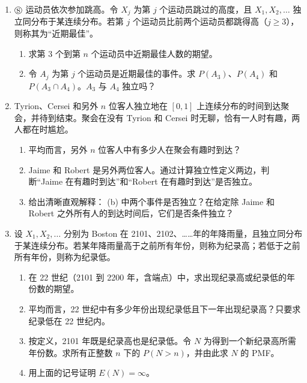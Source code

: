 \documentclass[UTF8,12pt,a4paper,fontset=fandol]{ctexart}
\begin{document}
\begin{enumerate}
  \item $\circledS$ 运动员依次参加跳高。令 $X_j$ 为第 $j$ 个运动员跳过的高度，且 $X_1,X_2,\ldots$ 独立同分布于某连续分布。若第 $j$ 个运动员比前两个运动员都跳得高（$j\ge3$），则称其为“近期最佳”。
  \begin{enumerate}
    \item 求第 $3$ 个到第 $n$ 个运动员中近期最佳人数的期望。
    \item 令 $A_j$ 为第 $j$ 个运动员是近期最佳的事件。求 $P(A_3)$、$P(A_4)$ 和 $P(A_3\cap A_4)$。$A_3$ 与 $A_4$ 独立吗？
  \end{enumerate}

  \item Tyrion、Cersei 和另外 $n$ 位客人独立地在 $[0,1]$ 上连续分布的时间到达聚会，并待到结束。聚会在没有 Tyrion 和 Cersei 时无聊，恰有一人时有趣，两人都在时尴尬。
  \begin{enumerate}
    \item 平均而言，另外 $n$ 位客人中有多少人在聚会有趣时到达？
    \item Jaime 和 Robert 是另外两位客人。通过计算独立性定义两边，判断“Jaime 在有趣时到达”和“Robert 在有趣时到达”是否独立。
    \item 给出清晰直观解释： (b) 中两个事件是否独立？在给定除 Jaime 和 Robert 之外所有人的到达时间后，它们是否条件独立？
  \end{enumerate}

  \item 设 $X_1,X_2,\ldots$ 分别为 Boston 在 2101、2102、……年的年降雨量，且独立同分布于某连续分布。若某年降雨量高于之前所有年份，则称为纪录高；若低于之前所有年份，则称为纪录低。
  \begin{enumerate}
    \item 在 22 世纪（2101 到 2200 年，含端点）中，求出现纪录高或纪录低的年份数的期望。
    \item 平均而言，22 世纪中有多少年份出现纪录低且下一年出现纪录高？只要求纪录低在 22 世纪内。
    \item 按定义，2101 年既是纪录高也是纪录低。令 $N$ 为得到一个新纪录高所需年份数。求所有正整数 $n$ 下的 $P(N>n)$，并由此求 $N$ 的 PMF。
    \item 用上面的记号证明 $E(N)=\infty$。
  \end{enumerate}
\end{enumerate}
\end{document}
